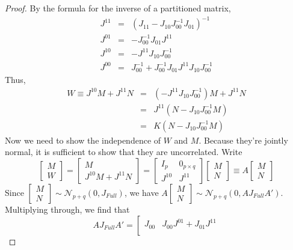 \documentclass[12pt]{article}
\theoremstyle{definition}
\begin{document}
\begin{proof}
By the formula for the inverse of a partitioned matrix,
	\begin{eqnarray*}
		J^{11} &=&\left(J_{11} - J_{10}J_{00}^{-1}J_{01}\right)^{-1}\\
		J^{01} &=&-J_{00}^{-1}J_{01}J^{11}\\
		J^{10} &=&-J^{11}J_{10}J_{00}^{-1}\\
		J^{00} &=& J_{00}^{-1} + J_{00}^{-1}J_{01}J^{11}J_{10}J_{00}^{-1}
	\end{eqnarray*}
Thus,
	\begin{eqnarray*}
		W \equiv J^{10}M + J^{11}N &=& \left(-J^{11}J_{10}J_{00}^{-1}\right)M + J^{11}N\\
			&=&J^{11}\left( N - J_{10}J_{00}^{-1}M \right)\\
			&=&K\left( N - J_{10}J_{00}^{-1}M \right)
	\end{eqnarray*}
Now we need to show the independence of $W$ and $M$. Because they're jointly normal, it is sufficient to show that they are uncorrelated. Write
	$$
	\left[\begin{array}{c}
		M\\
		W
	\end{array}\right] = \left[\begin{array}{c}
		M\\
		J^{10}M + J^{11}N
	\end{array}\right] = \left[\begin{array}{cc}
		I_p&0_{p\times q}\\
		J^{10}&J^{11}
	\end{array}\right]\left[\begin{array}{c}
		M\\
		N
	\end{array}\right]\equiv A \left[\begin{array}{c}
		M\\
		N
	\end{array}\right]
$$
Since $\left[\begin{array}{c} M\\ N \end{array}\right]\sim \mathcal{N}_{p+q}(0, J_{Full})$, we have $A\left[\begin{array}{c} M\\ N \end{array}\right]\sim \mathcal{N}_{p+q}(0, A J_{Full}A')$. Multiplying through, we find that
	$$
	AJ_{Full}A' = \left[\begin{array}{cc}
		J_{00}& J_{00}J^{01}+J_{01}J^{11}\\

\end{array}$$
\end{proof}
\end{document}
